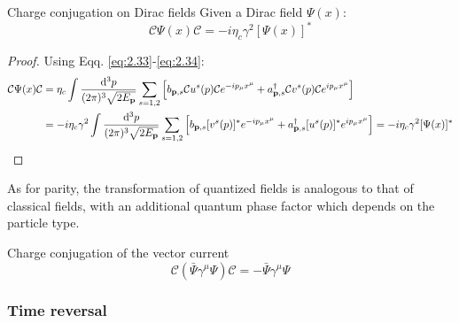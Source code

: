 \begin{proposition}{Charge conjugation on Dirac fields}{}
  Given a Dirac field $ \Psi(x) $:
  \begin{equation}
    \mathcal{C} \Psi(x) \mathcal{C} = -i \eta_c \gamma^2 [\Psi(x)]^*
    \label{eq:2.35}
  \end{equation}

  \tcblower

  \begin{proof}
    Using Eqq. \ref{eq:2.33}-\ref{eq:2.34}:
    \begin{equation*}
      \begin{split}
        \mathcal{C} \Psi(x) \mathcal{C}
        &= \eta_c \int \frac{\mathrm{d}^3p}{(2\pi)^3 \sqrt{2E_{\mathbf{p}}}} \sum_{s = 1,2} \left[ b_{\mathbf{p},s} \mathcal{C} u^s(p) \mathcal{C} e^{-i p_\mu x^\mu} + a_{\mathbf{p},s}^\dagger \mathcal{C} v^s(p) \mathcal{C} e^{i p_\mu x^\mu} \right] \\
        &= -i \eta_c \gamma^2 \int \frac{\mathrm{d}^3p}{(2\pi)^3 \sqrt{2E_{\mathbf{p}}}} \sum_{s = 1,2} \left[ b_{\mathbf{p},s} [v^s(p)]^* e^{-i p_\mu x^\mu} + a_{\mathbf{p},s}^\dagger [u^s(p)]^* e^{i p_\mu x^\mu} \right] = -i \eta_c \gamma^2 [\Psi(x)]^*
      \end{split}
    \end{equation*}
  \end{proof}
\end{proposition}

As for parity, the transformation of quantized fields is analogous to that of classical fields, with an additional quantum phase factor which depends on the particle type.

\begin{proposition}{Charge conjugation of the vector current}{}
  \begin{equation}
    \mathcal{C} \left( \bar{\Psi} \gamma^\mu \Psi \right) \mathcal{C} = - \bar{\Psi} \gamma^\mu \Psi
    \label{eq:2.36}
  \end{equation}
\end{proposition}

\subsubsection{Time reversal}

